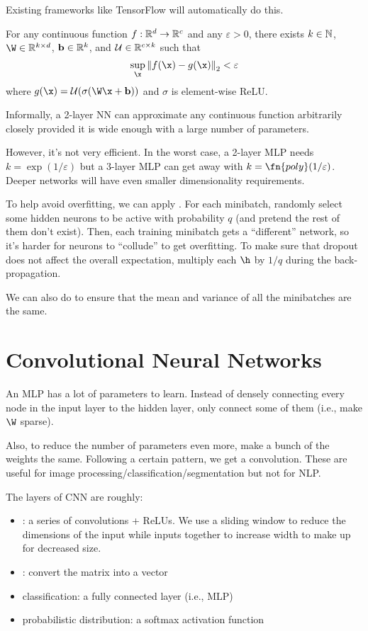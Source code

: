 \documentclass[class=cs480,notes,tikz]{agony}
\begin{document}
Existing frameworks like TensorFlow will automatically do this.

\begin{theorem}
  For any continuous function $f : \mathbb{R}^d \to \mathbb{R}^c$ and any $\varepsilon > 0$,
  there exists $k \in \mathbb{N}$, $\W \in \R^{k \times d}$, $\vb b \in \mathbb{R}^k$,
  and $\mathcal{U} \in \mathbb{R}^{c \times k}$ such that
  \[ \sup_{\x}\norm{f(\x) - g(\x)}_2 < \varepsilon \]
  where $g(\x) = \U(\sigma(\W\x + \vb b))$ and $\sigma$ is element-wise ReLU.
\end{theorem}

Informally, a 2-layer NN can approximate any continuous function arbitrarily closely
provided it is wide enough with a large number of parameters.

However, it's not very efficient.
In the worst case, a 2-layer MLP needs $k = \exp(1/\varepsilon)$
but a 3-layer MLP can get away with $k = \fn{poly}(1/\varepsilon)$.
Deeper networks will have even smaller dimensionality requirements.

To help avoid overfitting, we can apply .
For each minibatch, randomly select some hidden neurons to be active with probability $q$
(and pretend the rest of them don't exist).
Then, each training minibatch gets a ``different'' network,
so it's harder for neurons to ``collude'' to get overfitting.
To make sure that dropout does not affect the overall expectation,
multiply each $\h$ by $1/q$ during the back-propagation.

We can also do 
to ensure that the mean and variance of all the minibatches are the same.

\section{Convolutional Neural Networks}

An MLP has a lot of parameters to learn.
Instead of densely connecting every node in the input layer to the hidden layer,
only connect some of them (i.e., make $\W$ sparse).

Also, to reduce the number of parameters even more, make a bunch of the weights the same.
Following a certain pattern, we get a convolution.
These are useful for image processing/classification/segmentation
but not for NLP.

The layers of CNN are roughly:
\begin{itemize}[nosep]
  \item {}: a series of convolutions + ReLUs.
        We use a sliding window to reduce the dimensions of the input
        while  inputs together to increase width to make up for decreased size.
  \item {}: convert the matrix into a vector
  \item classification: a fully connected layer (i.e., MLP)
  \item probabilistic distribution: a softmax activation function
\end{itemize}
\end{document}
